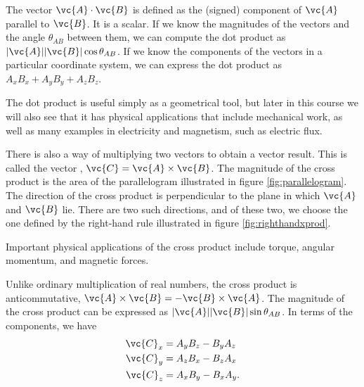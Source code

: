The vector  $\vc{A}\cdot\vc{B}$ is defined as the (signed) component of $\vc{A}$
parallel to $\vc{B}$. It is a scalar. If we know the magnitudes of the vectors and the angle $\theta_{AB}$ between them,
we can compute the dot product as $|\vc{A}||\vc{B}|\cos\theta_{AB}$. If we know the components of
the vectors in a particular coordinate system, we can express the dot product as
$A_xB_x+A_yB_y+A_zB_z$.

The dot product is useful simply as a geometrical tool, but later in this course we will also see that it
has physical applications that include mechanical work, as well as many examples in electricity and magnetism,
such as electric flux.

There is also a way of multiplying two vectors to obtain a vector result. This is called the
vector , $\vc{C}=\vc{A}\times\vc{B}$.
The magnitude of the cross product is the area of the parallelogram
illustrated in figure \ref{fig:parallelogram}.
The direction of the cross product is perpendicular to the plane in which $\vc{A}$ and $\vc{B}$ lie.
There are two such directions, and of these two, we choose the one defined by the right-hand rule
illustrated in figure \ref{fig:righthandxprod}.



Important physical applications of the cross product include torque, angular momentum, and magnetic forces.

Unlike ordinary multiplication of real numbers, the cross product is anticommutative,
$\vc{A}\times\vc{B}=-\vc{B}\times\vc{A}$. The magnitude of the cross product can be expressed as
$|\vc{A}||\vc{B}|\sin\theta_{AB}$. In terms of the components, we have
\begin{align*}
        \vc{C}_x        &=  A_yB_z - B_yA_z\\
        \vc{C}_y        &=  A_zB_x - B_zA_x\\
        \vc{C}_z        &=  A_xB_y - B_xA_y.
\end{align*}
